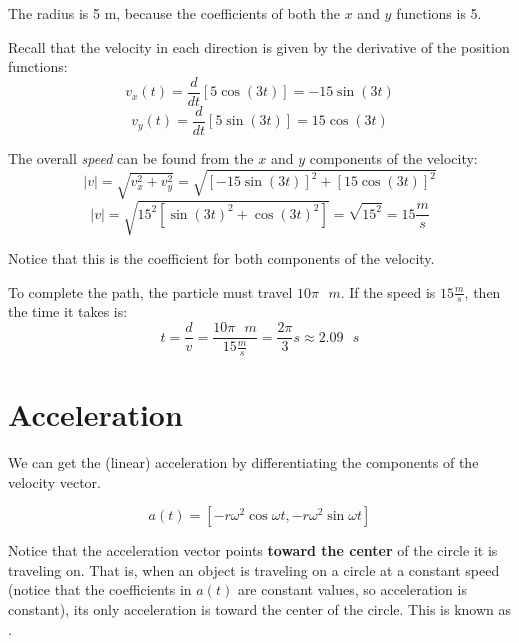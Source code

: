 \begin{Answer}[ref = particle]
The radius is 5 m, because the coefficients of both the $x$ and $y$ functions is 5. 

Recall that the velocity in each direction is given by the derivative of the position functions:
$$v_x(t) = \frac{d}{dt} \left[ 5 \cos{ \left( 3t \right)} \right] = -15 \sin{ \left( 3t \right)}$$
$$v_y(t) = \frac{d}{dt} \left[ 5 \sin{ \left( 3t \right)} \right] = 15 \cos{ \left( 3t \right)}$$

The overall \textit{speed} can be found from the $x$ and $y$ components of the velocity:
$$|v| = \sqrt{v_x^2 + v_y^2} = \sqrt{\left[ -15 \sin{ \left( 3t \right) } \right]^2 + \left[ 15 \cos{ \left( 3t \right)} \right]^2}$$
$$|v| = \sqrt{15^2 \left[ \sin{ \left(3t \right)}^2 + \cos{ \left( 3t \right)}^2 \right]} = \sqrt{15^2} = 15 \frac{m}{s}$$

Notice that this is the coefficient for both components of the velocity. 

To complete the path, the particle must travel $10\pi \text{ } m$. If the speed is $15 \frac{m}{s}$, then the time it takes is:
$$t = \frac{d}{v} = \frac{10\pi \text{ } m}{15 \frac{m}{s}} = \frac{2\pi}{3} s \approx 2.09 \text{ } s$$
\end{Answer}

\section{Acceleration}

We can get the (linear) acceleration by differentiating the components of the velocity vector.

$$a(t) = \left[-r \omega^2 \cos{\omega t}, -r \omega^2 \sin{\omega t} \right]$$

Notice that the acceleration vector points \textbf{toward the center} of the
circle it is traveling on. That is, when an object is traveling on a
circle at a constant speed (notice that the coefficients in $a(t)$ are constant values, so acceleration is constant), its only acceleration is toward the center of the circle. This is known as . 

